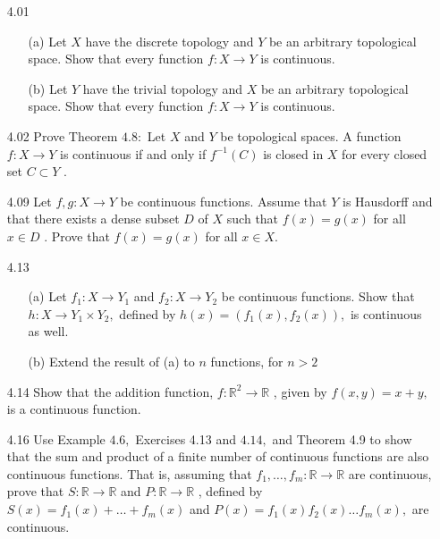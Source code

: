 \documentclass[12pt]{article}
\begin{document}
\pagestyle{fancy}  
\lfoot{} \cfoot{} \rfoot{}

\begin{enumerate}

	\item[4.01] 
	\begin{enumerate}
	
	\item[(a)] Let $X$ have the discrete topology and $Y$ be an arbitrary topological space.
	Show that every function $f : X \rightarrow Y$ is continuous.
	
	\item[(b)]Let $Y$ have the trivial topology and $X$ be an arbitrary topological space.
	Show that every function $f : X \rightarrow Y$ is continuous.
	
	\end{enumerate}
	\item[4.02] Prove Theorem $4.8 :$ Let $X$ and $Y$ be topological spaces. A function $f : X \rightarrow Y$ is continuous if and only if $f ^ { - 1 } ( C )$ is closed in $X$ for every closed set $C \subset Y$ .
	
	\item[4.09] Let $f , g : X \rightarrow Y$ be continuous functions. Assume that $Y$ is Hausdorff and
	that there exists a dense subset $D$ of $X$ such that $f ( x ) = g ( x )$ for all $x \in D$ .
	Prove that $f ( x ) = g ( x )$ for all $x \in X .$
	
	\item[4.13]
	  \begin{enumerate}
	  	\item[(a)] Let $f _ { 1 } : X \rightarrow Y _ { 1 }$ and $f _ { 2 } : X \rightarrow Y _ { 2 }$ be continuous functions. Show that
	  	$h : X \rightarrow Y _ { 1 } \times Y _ { 2 } ,$ defined by $h ( x ) = \left( f _ { 1 } ( x ) , f _ { 2 } ( x ) \right) ,$ is continuous as well.
	  	
	  	\item[(b)] Extend the result of (a) to $n$ functions, for $n > 2$
	  \end{enumerate}
	
	\item[4.14] Show that the addition function, $f : \mathbb { R } ^ { 2 } \rightarrow \mathbb { R }$ , given by $f ( x , y ) = x + y ,$ is a continuous function.
	
	\item[4.16] Use Example $4.6 ,$ Exercises 4.13 and $4.14 ,$ and Theorem 4.9 to show that the
	sum and product of a finite number of continuous functions are also continuous functions. That is, assuming that $f _ { 1 } , \ldots , f _ { m } : \mathbb { R } \rightarrow \mathbb { R }$ are continuous, prove that $S : \mathbb { R } \rightarrow \mathbb { R }$ and $P : \mathbb { R } \rightarrow \mathbb { R }$ , defined by $S ( x ) = f _ { 1 } ( x ) + \ldots + f _ { m } ( x )$ and $P ( x ) = f _ { 1 } ( x ) f _ { 2 } ( x ) \ldots f _ { m } ( x ) ,$ are continuous.
	

\end{enumerate}
\end{document}
